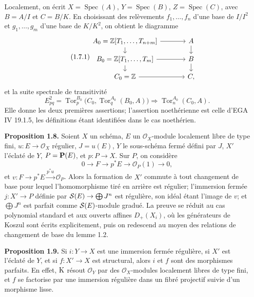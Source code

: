 \documentclass[11pt]{article}
\newcommand{\Tor}{\operatorname{Tor}}
\newcommand{\Spec}{\operatorname{Spec}}
\providecommand{\Tor}{\operatorname{Tor}}
\providecommand{\cO}{\mathcal O}
\begin{document}
Localement, on écrit \(X=\Spec(A)\), \(Y=\Spec(B)\), \(Z=\Spec(C)\), avec \(B=A/I\) et \(C=B/K\). En choisissant des relèvements \(f_1,\ldots,f_n\) d'une base de \(I/I^2\) et \(g_1,\ldots,g_m\) d'une base de \(K/K^2\), on obtient le diagramme
\begin{equation}\tag{1.7.1}
\begin{tikzcd}[column sep=large,row sep=small]
A_0=\mathbb Z[T_1,\ldots,T_{n+m}] \arrow[r] \arrow[d] & A \arrow[d]\\
B_0=\mathbb Z[T_1,\ldots,T_m] \arrow[r] \arrow[d] & B \arrow[d]\\
C_0=\mathbb Z \arrow[r] & C,
\end{tikzcd}
\end{equation}
et la suite spectrale de transitivité
\begin{equation}\tag{1.7.3}
E^2_{pq}=\Tor_p^{B_0}\bigl(C_0,\Tor_q^{A_0}(B_0,A)\bigr)\Rightarrow\Tor_n^{A_0}(C_0,A).
\end{equation}
Elle donne les deux premières assertions; l'assertion noethérienne est celle d'EGA IV 19.1.5, les définitions étant identifiées dans le cas noethérien.

\textbf{Proposition 1.8.} Soient \(X\) un schéma, \(E\) un \(\cO_X\)-module localement libre de type fini, \(u:E\to\cO_X\) régulier, \(J=u(E)\), \(Y\) le sous-schéma fermé défini par \(J\), \(X'\) l'éclaté de \(Y\), \(P=\mathbf P(E)\), et \(p:P\to X\). Sur \(P\), on considère
\begin{equation}\tag{1.8.1}
0\to F\to p^*E\to\cO_P(1)\to0,
\end{equation}
et \(v:F\to p^*E\xrightarrow{p^*u}\cO_P\). Alors la formation de \(X'\) commute à tout changement de base pour lequel l'homomorphisme tiré en arrière est régulier; l'immersion fermée \(j:X'\to P\) définie par \(\mathcal S(E)\to\bigoplus J^n\) est régulière, son idéal étant l'image de \(v\); et \(\bigoplus J^n\) est parfait comme \(\mathcal S(E)\)-module gradué. La preuve se réduit au cas polynomial standard et aux ouverts affines \(D_+(X_i)\), où les générateurs de Koszul sont écrits explicitement, puis on redescend au moyen des relations de changement de base du lemme 1.2.

\textbf{Proposition 1.9.} Si \(i:Y\to X\) est une immersion fermée régulière, si \(X'\) est l'éclaté de \(Y\), et si \(f:X'\to X\) est structural, alors \(i\) et \(f\) sont des morphismes parfaits. En effet, \(\mathrm K\) résout \(\cO_Y\) par des \(\cO_X\)-modules localement libres de type fini, et \(f\) se factorise par une immersion régulière dans un fibré projectif suivie d'un morphisme lisse.
\end{document}
